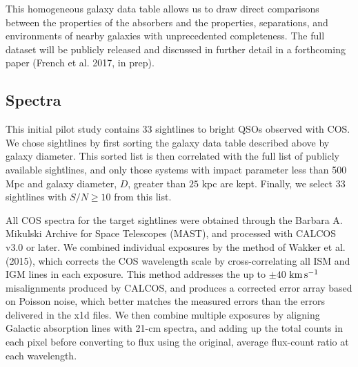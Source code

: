 \documentclass[twocolumn,tighten]{aastex6}
\begin{document}
This homogeneous galaxy data table allows us to draw direct comparisons between the properties of the absorbers and the properties, separations, and environments of nearby galaxies with unprecedented completeness. The full dataset will be publicly released and discussed in further detail in a forthcoming paper (French et al. 2017, in prep).


\subsection{Spectra}

This initial pilot study contains 33 sightlines to bright QSOs observed with COS. We chose sightlines by first sorting the galaxy data table described above by galaxy diameter. This sorted list is then correlated with the full list of publicly available sightlines, and only those systems with impact parameter less than 500 Mpc and galaxy diameter, $D$, greater than $25$ kpc  are kept. Finally, we select 33 sightlines with $S/N \geq 10$ from this list.

All COS spectra for the target sightlines were obtained through the Barbara A. Mikulski Archive for Space Telescopes (MAST), and processed with CALCOS v3.0 or later. We combined individual exposures by the method of Wakker et al. (2015), which corrects the COS wavelength scale by cross-correlating all ISM and IGM lines in each exposure. This method addresses the up to $\pm40$ $\rm km\, s^{-1}$ misalignments produced by CALCOS, and produces a corrected error array based on Poisson noise, which better matches the measured errors than the errors delivered in the x1d files. We then combine multiple exposures by aligning Galactic absorption lines with 21-cm spectra, and adding up the total counts in each pixel before converting to flux using the original, average flux-count ratio at each wavelength.
\end{document}
